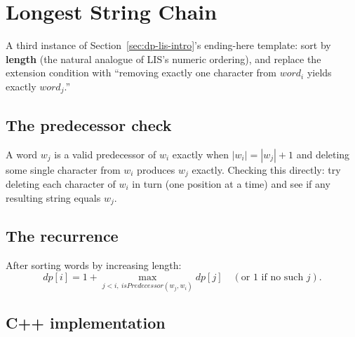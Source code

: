 \section{Longest String Chain}
\label{sec:dp-longest-string-chain}


\begin{patternbox}
A third instance of Section~\ref{sec:dp-lis-intro}'s ending-here
template: sort by \textbf{length} (the natural analogue of LIS's
numeric ordering), and replace the extension condition with ``removing
exactly one character from $\textit{word}_i$ yields exactly
$\textit{word}_j$.''
\end{patternbox}

\subsection*{The predecessor check}

A word $w_j$ is a valid predecessor of $w_i$ exactly when
$|w_i| = |w_j| + 1$ and deleting some single character from $w_i$
produces $w_j$ exactly. Checking this directly: try deleting each
character of $w_i$ in turn (one position at a time) and see if any
resulting string equals $w_j$.

\subsection*{The recurrence}

After sorting words by increasing length:
\[
  \textit{dp}[i] = 1 + \max_{j<i,\ \textit{isPredecessor}(w_j, w_i)}
  \textit{dp}[j] \quad (\text{or } 1 \text{ if no such } j).
\]

\subsection*{C++ implementation}

